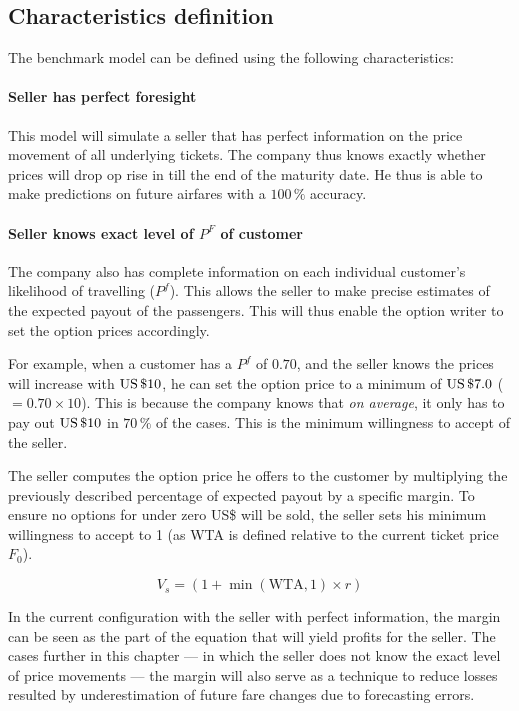 \subsection{Characteristics definition}
The benchmark model can be defined using the following characteristics:

\paragraph{Seller has perfect foresight}
This model will simulate a seller that has perfect information on the price movement of all underlying tickets. The company thus knows exactly whether prices will drop op rise in till the end of the maturity date. He thus is able to make predictions on future airfares with a $100\,\%$ accuracy.

\paragraph{Seller knows exact level of $P^F$ of customer}
The company also has complete information on each individual customer's likelihood of travelling ($P^f$). This allows the seller to make precise estimates of the expected payout of the passengers. This will thus enable the option writer to set the option prices accordingly.

For example, when a customer has a $P^f$ of $0.70$, and the seller knows the prices will increase with $\mbox{US\,\$} 10$, he can set the option price to a minimum of $\mbox{US\,\$} 7.0$ ($= 0.70 \times 10$). This is because the company knows that \emph{on average}, it only has to pay out $\mbox{US\,\$} 10$ in $70\,\%$ of the cases. This is the minimum willingness to accept of the seller.

The seller computes the option price he offers to the customer by multiplying the previously described percentage of expected payout by a specific margin. To ensure no options for under zero US\$ will be sold, the seller sets his minimum willingness to accept to 1 (as WTA is defined relative to the current ticket price $F_0$).

$$ V_s = (1 + \min(\mbox{WTA}, 1) \times r) $$

In the current configuration with the seller with perfect information, the margin can be seen as the part of the equation that will yield profits for the seller. The cases further in this chapter --- in which the seller does not know the exact level of price movements --- the margin will also serve as a technique to reduce losses resulted by underestimation of future fare changes due to forecasting errors.

